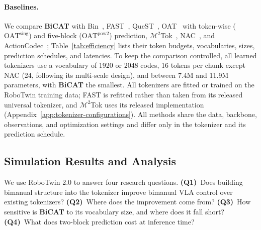 \paragraph{Baselines.}
We compare \textbf{BiCAT} with Bin~\cite{kim2024openvla},
FAST~\cite{pertsch2025fast}, QueST~\cite{mete2024quest},
OAT~\cite{liu2026oat_rss} with token-wise ($\mathrm{OAT}^{\mathrm{sing}}$)
and five-block ($\mathrm{OAT}^{\mathrm{pow2}}$) prediction,
$\mathcal{M}^{2}$Tok~\cite{xu2026m2tok}, NAC~\cite{jawaid2026nac}, and
ActionCodec~\cite{dong2026actioncodec}; Table~\ref{tab:efficiency} lists
their token budgets, vocabularies, sizes, prediction schedules, and
latencies. To keep the comparison controlled, all learned tokenizers use a
vocabulary of 1920 or 2048 codes, 16 tokens per chunk except NAC (24,
following its multi-scale design), and between 7.4M and 11.9M parameters,
with \textbf{BiCAT} the smallest. All tokenizers are fitted or trained on
the RoboTwin training data; FAST is refitted rather than taken from its
released universal tokenizer, and $\mathcal{M}^{2}$Tok uses its released
implementation (Appendix~\ref{app:tokenizer-configurations}). All methods
share the data, backbone,
observations, and optimization settings and differ only in the tokenizer
and its prediction schedule.



\subsection{Simulation Results and Analysis}
\label{sec:simulation-control}

We use RoboTwin 2.0 to answer four research questions.
\textbf{(Q1)}~Does building bimanual structure into the tokenizer improve
bimanual VLA control over existing tokenizers?
\textbf{(Q2)}~Where does the improvement come from?
\textbf{(Q3)}~How sensitive is \textbf{BiCAT} to its vocabulary size, and
where does it fall short?
\textbf{(Q4)}~What does two-block prediction cost at inference time?

